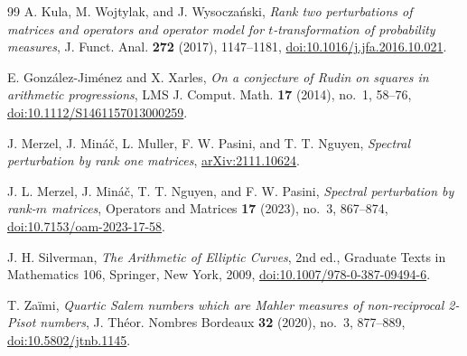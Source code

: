 \documentclass[11pt,reqno]{amsart}
\theoremstyle{definition}
\theoremstyle{remark}
\begin{document}
\begin{thebibliography}{99}
A. Kula, M. Wojtylak, and J. Wysocza\'nski,
\emph{Rank two perturbations of matrices and operators and operator model for
$t$-transformation of probability measures},
J. Funct. Anal. \textbf{272} (2017), 1147--1181,
\href{https://doi.org/10.1016/j.jfa.2016.10.021}
{doi:10.1016/j.jfa.2016.10.021}.

E. Gonz\'alez-Jim\'enez and X. Xarles,
\emph{On a conjecture of Rudin on squares in arithmetic progressions},
LMS J. Comput. Math. \textbf{17} (2014), no.~1, 58--76,
\href{https://doi.org/10.1112/S1461157013000259}
{doi:10.1112/S1461157013000259}.

J. Merzel, J. Min\'a\v c, L. Muller, F. W. Pasini, and T. T. Nguyen,
\emph{Spectral perturbation by rank one matrices},
\href{https://arxiv.org/abs/2111.10624}{arXiv:2111.10624}.

J. L. Merzel, J. Min\'a\v c, T. T. Nguyen, and F. W. Pasini,
\emph{Spectral perturbation by rank-$m$ matrices},
Operators and Matrices \textbf{17} (2023), no.~3, 867--874,
\href{https://doi.org/10.7153/oam-2023-17-58}
{doi:10.7153/oam-2023-17-58}.

J. H. Silverman,
\emph{The Arithmetic of Elliptic Curves},
2nd ed., Graduate Texts in Mathematics 106, Springer, New York, 2009,
\href{https://doi.org/10.1007/978-0-387-09494-6}
{doi:10.1007/978-0-387-09494-6}.

T. Za\"imi,
\emph{Quartic Salem numbers which are Mahler measures of non-reciprocal
2-Pisot numbers},
J. Th\'eor. Nombres Bordeaux \textbf{32} (2020), no.~3, 877--889,
\href{https://doi.org/10.5802/jtnb.1145}{doi:10.5802/jtnb.1145}.

\end{thebibliography}
\end{document}
